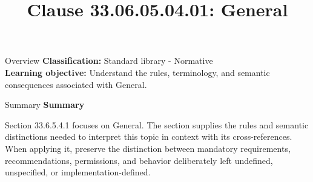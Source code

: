 \documentclass[10pt,letterpaper]{article}
\title{Clause 33.06.05.04.01: General}
\author{}
\date{}
\begin{document}
\maketitle
\begin{CornellOverviewBox}{Overview}
\textbf{Classification:} Standard library - Normative\\[2pt]
\textbf{Learning objective:} Understand the rules, terminology, and semantic consequences associated with General.
\end{CornellOverviewBox}\begin{CornellSummaryBox}{Summary}
{\sffamily\bfseries\color{Accent} Summary}\par\vspace{3pt}Section 33.6.5.4.1 focuses on General. The section supplies the rules and semantic distinctions needed to interpret this topic in context with its cross-references. When applying it, preserve the distinction between mandatory requirements, recommendations, permissions, and behavior deliberately left undefined, unspecified, or implementation-defined.
\end{CornellSummaryBox}
\end{document}
